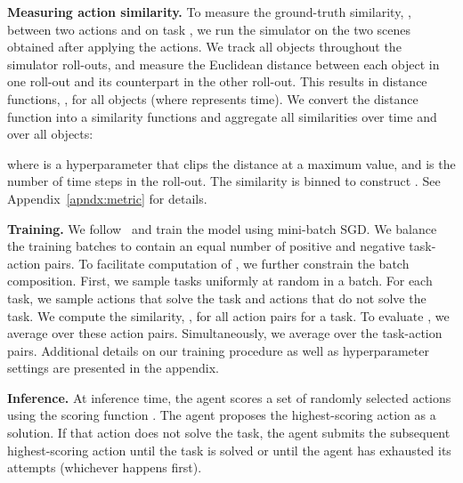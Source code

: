\documentclass{article}
\begin{document}
\noindent\textbf{Measuring action similarity.} To measure the ground-truth similarity, , between two actions  and  on task , we run the simulator on the two scenes obtained after applying the actions.
We track all objects throughout the simulator roll-outs, and measure the Euclidean distance between each object in one roll-out and its counterpart in the other roll-out. 
This results in distance functions, , for all objects  (where  represents time).
We convert the distance function into a similarity functions and aggregate all similarities over time and over all objects:

where  is a hyperparameter that clips the distance at a maximum value, and  is the number of time steps in the roll-out. The similarity  is binned to construct . See Appendix~\ref{apndx:metric} for details. 

\noindent\textbf{Training.} We follow~\cite{bakhtin2019phyre} and train the model using mini-batch SGD.
We balance the training batches to contain an equal number of positive and negative task-action pairs. 
To facilitate computation of , we further constrain the batch composition.
First, we sample  tasks uniformly at random in a batch. 
For each task, we sample  actions that solve the task and  actions that do not solve the task.
We compute the similarity, , for all  action pairs for a task.
To evaluate , we average over these  action pairs.
Simultaneously, we average  over the  task-action pairs.
Additional details on our training procedure as well as hyperparameter settings are presented in the appendix.

\noindent\textbf{Inference.} At inference time, the agent scores a set of  randomly selected actions using the scoring function . The agent proposes the highest-scoring action as a solution. If that action does not solve the task, the agent submits the subsequent highest-scoring action until the task is solved or until the agent has exhausted its attempts (whichever happens first).
\end{document}
